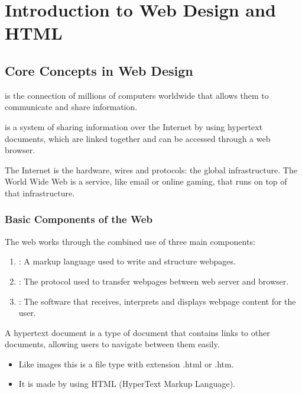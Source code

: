 
\chapter{Introduction to Web Design and HTML}

\section{Core Concepts in Web Design}

\begin{definitionbox}[Internet]
     is the connection of millions of computers worldwide that allows them to communicate and share information.
\end{definitionbox}

\begin{definitionbox}
     is a system of sharing information over the Internet by using hypertext documents, which are linked together and can be accessed through a web browser.
\end{definitionbox}

\Note The Internet is the hardware, wires and protocols: the global infrastructure. The World Wide Web is a service, like email or online gaming, that runs on top of that infrastructure.

\subsection{Basic Components of the Web}

The web works through the combined use of three main components:

\begin{enumerate}
    \item {}: A markup language used to write and structure webpages.
    \item {}: The protocol used to transfer webpages between web server and browser.
    \item {}: The software that receives, interprets and displays webpage content for the user.
\end{enumerate}

\par\vspace{\baselineskip}

\begin{definitionbox}
    A hypertext document is a type of document that contains links to other documents, allowing users to navigate between them easily. 
    \begin{itemize}
        \item Like images this is a file type with extension .html or .htm.
        \item It is made by using HTML (HyperText Markup Language).
    \end{itemize}
\end{definitionbox}

